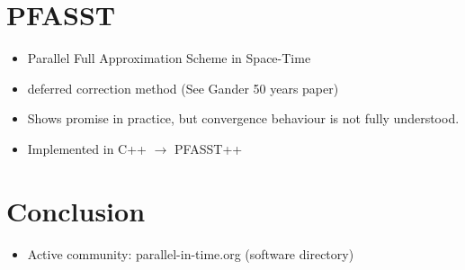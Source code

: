 \documentclass[aspectratio=169]{beamer}
\begin{document}
    \section{PFASST}
    \begin{frame}
        \begin{itemize}
            \item Parallel Full Approximation Scheme in Space-Time
            \item deferred correction method (See Gander 50 years paper)
            \item Shows promise in practice, but convergence behaviour is not fully understood.
            \item Implemented in C++ $\to$ PFASST++
        \end{itemize}
    \end{frame}

    \section{Conclusion}
    \begin{frame}
        \begin{itemize}
            \item Active community: parallel-in-time.org (software directory)
        \end{itemize}
    \end{frame}
\end{document}
